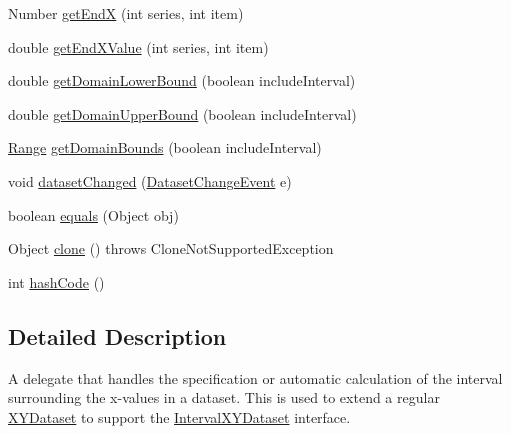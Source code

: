 \begin{DoxyCompactItemize}
\item 
Number \mbox{\hyperlink{classorg_1_1jfree_1_1data_1_1xy_1_1_interval_x_y_delegate_a46859c55956ba9f85cd82672eeb8c25d}{get\+EndX}} (int series, int item)
\item 
double \mbox{\hyperlink{classorg_1_1jfree_1_1data_1_1xy_1_1_interval_x_y_delegate_a1416edd956b9f807f023f38998421645}{get\+End\+X\+Value}} (int series, int item)
\item 
double \mbox{\hyperlink{classorg_1_1jfree_1_1data_1_1xy_1_1_interval_x_y_delegate_a7ecacbb41b13efa1708571b8ada59998}{get\+Domain\+Lower\+Bound}} (boolean include\+Interval)
\item 
double \mbox{\hyperlink{classorg_1_1jfree_1_1data_1_1xy_1_1_interval_x_y_delegate_a15d3687d86832c5cb4b8b346f716e8c2}{get\+Domain\+Upper\+Bound}} (boolean include\+Interval)
\item 
\mbox{\hyperlink{classorg_1_1jfree_1_1data_1_1_range}{Range}} \mbox{\hyperlink{classorg_1_1jfree_1_1data_1_1xy_1_1_interval_x_y_delegate_a4b2d8f90fd92fc9108f9556c02b0febd}{get\+Domain\+Bounds}} (boolean include\+Interval)
\item 
void \mbox{\hyperlink{classorg_1_1jfree_1_1data_1_1xy_1_1_interval_x_y_delegate_aaec31bcad7387d643284cd2a3ca576ce}{dataset\+Changed}} (\mbox{\hyperlink{classorg_1_1jfree_1_1data_1_1general_1_1_dataset_change_event}{Dataset\+Change\+Event}} e)
\item 
boolean \mbox{\hyperlink{classorg_1_1jfree_1_1data_1_1xy_1_1_interval_x_y_delegate_aa5b2aea8ddfc66df0a233d4fb48c195e}{equals}} (Object obj)
\item 
Object \mbox{\hyperlink{classorg_1_1jfree_1_1data_1_1xy_1_1_interval_x_y_delegate_ada5c4ccbc95a673528798ae42a4a6a4e}{clone}} ()  throws Clone\+Not\+Supported\+Exception 
\item 
int \mbox{\hyperlink{classorg_1_1jfree_1_1data_1_1xy_1_1_interval_x_y_delegate_a0ea3d7126d100e94c1975b9fca43ebc4}{hash\+Code}} ()
\end{DoxyCompactItemize}


\subsection{Detailed Description}
A delegate that handles the specification or automatic calculation of the interval surrounding the x-\/values in a dataset. This is used to extend a regular \mbox{\hyperlink{interfaceorg_1_1jfree_1_1data_1_1xy_1_1_x_y_dataset}{X\+Y\+Dataset}} to support the \mbox{\hyperlink{interfaceorg_1_1jfree_1_1data_1_1xy_1_1_interval_x_y_dataset}{Interval\+X\+Y\+Dataset}} interface. 

